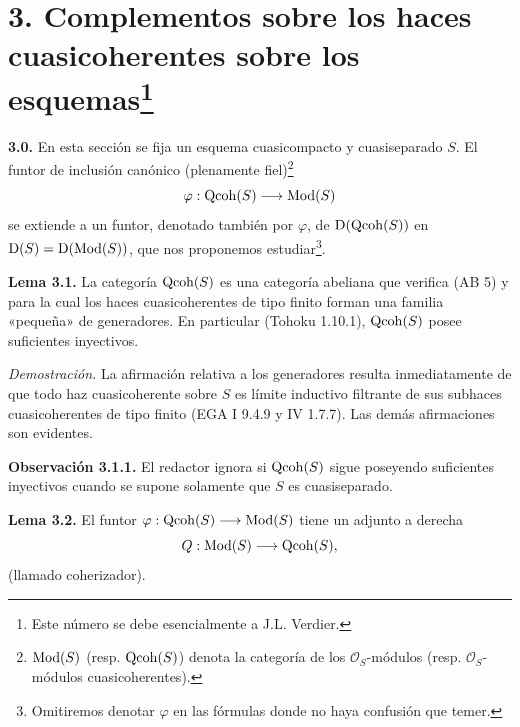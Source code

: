 \providecommand{\sisi}[2]{#2}

\section*{3. Complementos sobre los haces cuasicoherentes sobre los esquemas\protect\footnote{Este número se debe esencialmente a J.L. Verdier.}}

\textbf{3.0.} En esta sección se fija un esquema cuasicompacto y cuasiseparado $S$. El funtor de inclusión canónico (plenamente fiel)\footnote{$\operatorname{Mod}(S)$ (resp. $\operatorname{Qcoh}(S)$) denota la categoría de los $\mathcal O_S$-módulos (resp. $\mathcal O_S$-módulos cuasicoherentes).}
\[
 \varphi:\operatorname{Qcoh}(S)\longrightarrow\operatorname{Mod}(S)
\]
se extiende a un funtor, denotado también por $\varphi$, de $\mathrm D(\operatorname{Qcoh}(S))$ en $\mathrm D(S)=\mathrm D(\operatorname{Mod}(S))$, que nos proponemos estudiar\footnote{Omitiremos denotar $\varphi$ en las fórmulas donde no haya confusión que temer.}.

\textbf{Lema 3.1.} La categoría $\operatorname{Qcoh}(S)$ es una categoría abeliana que verifica (AB 5) y para la cual los haces cuasicoherentes de tipo finito forman una familia «pequeña» de generadores. En particular (Tohoku 1.10.1), $\operatorname{Qcoh}(S)$ posee suficientes inyectivos.

\emph{Demostración.} La afirmación relativa a los generadores resulta inmediatamente de que todo haz cuasicoherente sobre $S$ es límite inductivo filtrante de sus subhaces cuasicoherentes de tipo finito (EGA I 9.4.9 y IV 1.7.7). Las demás afirmaciones son evidentes.

\textbf{Observación 3.1.1.} El redactor ignora si $\operatorname{Qcoh}(S)$ sigue poseyendo suficientes inyectivos cuando se supone solamente que $S$ es cuasiseparado.

\textbf{Lema 3.2.} El funtor $\varphi:\operatorname{Qcoh}(S)\longrightarrow\operatorname{Mod}(S)$ tiene un adjunto a derecha
\[
 Q:\operatorname{Mod}(S)\longrightarrow\operatorname{Qcoh}(S),
\]
(llamado coherizador).

